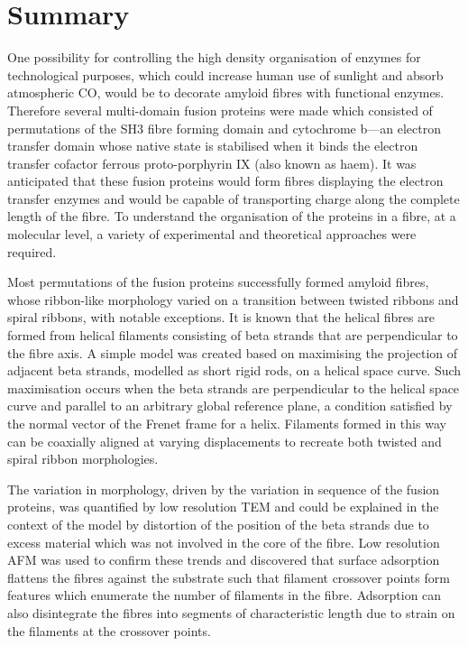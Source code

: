 \chapter*{Summary}
One possibility for controlling the high density organisation of enzymes for technological purposes, which could increase human use of sunlight and absorb atmospheric CO, would be to decorate amyloid fibres with functional enzymes. Therefore several multi-domain fusion proteins were made which consisted of permutations of the SH3 fibre forming domain and cytochrome b---an electron transfer domain whose native state is stabilised when it binds the electron transfer cofactor ferrous proto-porphyrin IX (also known as haem). It was anticipated that these fusion proteins would form fibres displaying the electron transfer enzymes and would be capable of transporting charge along the complete length of the fibre.  To understand the organisation of the proteins in a fibre, at a molecular level, a variety of experimental and theoretical approaches were required.

Most permutations of the fusion proteins successfully formed amyloid fibres, whose ribbon-like morphology varied on a transition between twisted ribbons and spiral ribbons, with notable exceptions. It is known that the helical fibres are formed from helical filaments consisting of beta strands that are perpendicular to the fibre axis. A simple model was created based on maximising the projection of adjacent beta strands, modelled as short rigid rods, on a helical space curve. Such maximisation occurs when the beta strands are perpendicular to the helical space curve and parallel to an arbitrary global reference plane, a condition satisfied by the normal vector of the Frenet frame for a helix. Filaments formed in this way can be coaxially aligned at varying displacements to recreate both twisted and spiral ribbon morphologies.

The variation in morphology, driven by the variation in sequence of the fusion proteins, was quantified by low resolution TEM and could be explained in the context of the model by distortion of the position of the beta strands due to excess material which was not involved in the core of the fibre. Low resolution AFM was used to confirm these trends and discovered that surface adsorption flattens the fibres against the substrate such that filament crossover points form features which enumerate the number of filaments in the fibre. Adsorption can also disintegrate the fibres into segments of characteristic length due to strain on the filaments at the crossover points.

